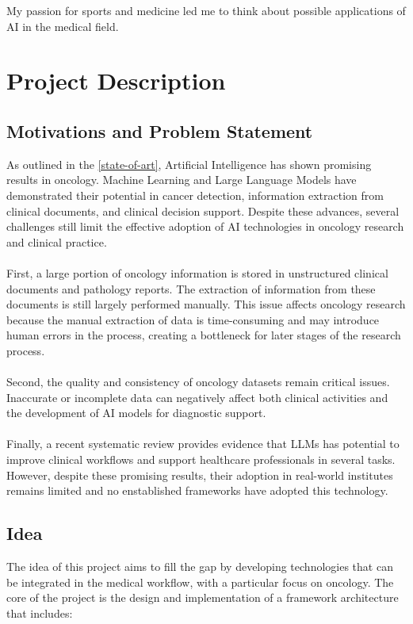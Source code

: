 \documentclass{scrartcl}
\begin{document}
My passion for sports and medicine led me to think about possible applications of AI in the medical field.

\section{Project Description}

\subsection{Motivations and Problem Statement}
As outlined in the \cref{state-of-art}, Artificial Intelligence has shown promising results in oncology. Machine Learning and Large Language Models have demonstrated their potential in cancer detection, information extraction from clinical documents, and clinical decision support.
Despite these advances, several challenges still limit the effective adoption of AI technologies in oncology research and clinical practice.
\\\\
First, a large portion of oncology information is stored in unstructured clinical documents and pathology reports. The extraction of information from these documents is still largely performed manually. This issue affects oncology research because the manual extraction of data is time-consuming and may introduce human errors in the process, creating a bottleneck for later stages of the research process. 
\\\\
Second, the quality and consistency of oncology datasets remain critical issues. Inaccurate or incomplete data can negatively affect both clinical activities and the development of AI models for diagnostic support.
\\\\
Finally, a recent systematic review provides evidence that LLMs has potential to improve clinical workflows and support healthcare professionals in several tasks. However, despite these promising results, their adoption in real-world institutes remains limited\cite{Artsi2025} and no enstablished frameworks have adopted this technology.
\subsection{Idea}
The idea of this project aims to fill the gap by developing technologies that can be integrated in the medical workflow, with a particular focus on oncology. 
The core of the project is the design and implementation of a framework architecture that includes:
\end{document}
